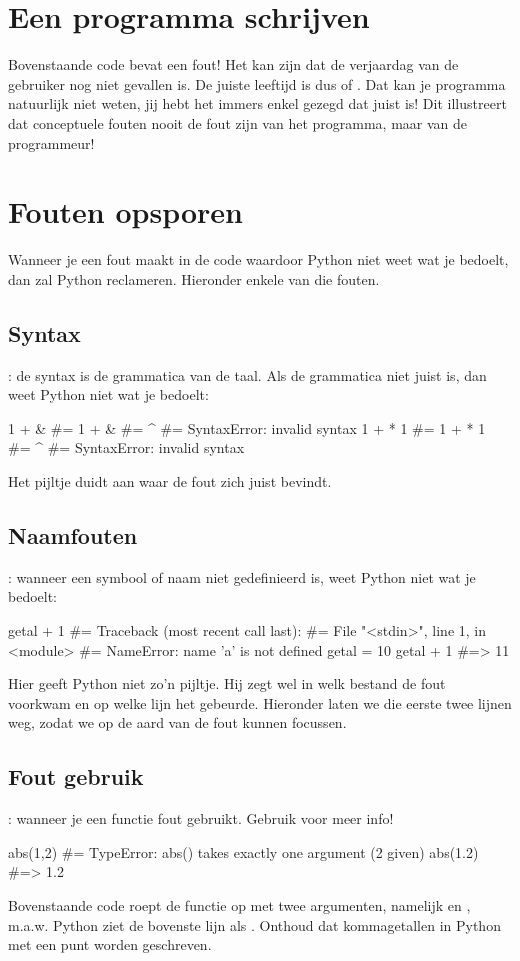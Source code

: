 \section{Een programma schrijven}
  Bovenstaande code bevat een fout! Het kan zijn dat de verjaardag van de
  gebruiker nog niet gevallen is. De juiste leeftijd is dus  of
  . Dat kan je programma natuurlijk niet weten, jij hebt
  het immers enkel gezegd dat  juist is! Dit illustreert dat
  conceptuele fouten nooit de fout zijn van het programma, maar van de
  programmeur!

\section{Fouten opsporen}
  Wanneer je een fout maakt in de code waardoor Python niet weet wat je bedoelt,
  dan zal Python reclameren. Hieronder enkele van die fouten.

  \subsection{Syntax}: de syntax is de grammatica van de taal. Als de grammatica
  niet juist is, dan weet Python niet wat je bedoelt:
  \begin{python}
    1 + &
    #=     1 + &
    #=         ^
    #= SyntaxError: invalid syntax
    1 + * 1
    #=     1 + * 1
    #=         ^
    #= SyntaxError: invalid syntax
  \end{python}
  Het pijltje duidt aan waar de fout zich juist bevindt.

  \subsection{Naamfouten}: wanneer een symbool of naam niet gedefinieerd is, weet
  Python niet wat je bedoelt:
  \begin{python}
    getal + 1
    #= Traceback (most recent call last):
    #=   File "<stdin>", line 1, in <module>
    #= NameError: name 'a' is not defined
    getal = 10
    getal + 1 #=> 11
  \end{python}
  Hier geeft Python niet zo'n pijltje. Hij zegt wel in welk
  bestand de fout voorkwam en op welke lijn het gebeurde. Hieronder laten we die
  eerste twee lijnen weg, zodat we op de aard van de fout kunnen focussen.

  \subsection{Fout gebruik}: wanneer je een functie fout gebruikt. Gebruik
   voor meer info!
  \begin{python}
    abs(1,2)
    #= TypeError: abs() takes exactly one argument (2 given)
    abs(1.2) #=> 1.2
  \end{python}
  Bovenstaande code roept de functie  op met twee
  argumenten, namelijk  en , m.a.w. Python ziet de bovenste
  lijn als \mbox{}. Onthoud dat kommagetallen in Python met een punt
  worden geschreven.

